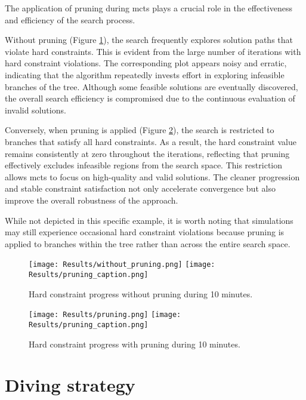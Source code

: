 The application of pruning during \ac{mcts} plays a crucial role in the effectiveness and efficiency of the search process.

Without pruning (Figure \ref{fig:without_pruning}), the search frequently explores solution paths that violate hard constraints. This is evident from the large number of iterations with hard constraint violations. The corresponding plot appears noisy and erratic, indicating that the algorithm repeatedly invests effort in exploring infeasible branches of the tree. Although some feasible solutions are eventually discovered, the overall search efficiency is compromised due to the continuous evaluation of invalid solutions.

Conversely, when pruning is applied (Figure \ref{fig:pruning}), the search is restricted to branches that satisfy all hard constraints. As a result, the hard constraint value remains consistently at zero throughout the iterations, reflecting that pruning effectively excludes infeasible regions from the search space. This restriction allows \ac{mcts} to focus on high-quality and valid solutions. The cleaner progression and stable constraint satisfaction not only accelerate convergence but also improve the overall robustness of the approach. 

While not depicted in this specific example, it is worth noting that simulations may still experience occasional hard constraint violations because pruning is applied to branches within the tree rather than across the entire search space.

\begin{figure}
 \centering
     \texttt{[image: Results/without\_pruning.png]}
     \texttt{[image: Results/pruning\_caption.png]}
     \caption{Hard constraint progress without pruning during 10 minutes.}
     \label{fig:without_pruning}
\end{figure}

\begin{figure}
 \centering
    \texttt{[image: Results/pruning.png]}
    \texttt{[image: Results/pruning\_caption.png]}
    \caption{Hard constraint progress with pruning during 10 minutes.}
    \label{fig:pruning}
\end{figure}



\section{Diving strategy}

